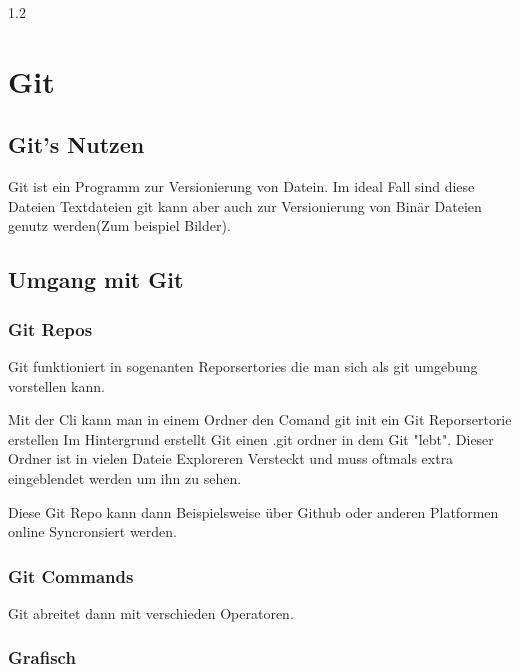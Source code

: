\documentclass{article}
\newcommand{\Zeilenabstand}{1.2}
\newcommand{\absatz}{5mm}
\begin{document}
\begin{spacing}{\Zeilenabstand}
\section{Git}

\subsection{Git's Nutzen}

Git ist ein Programm zur Versionierung von Datein. Im ideal Fall sind diese Dateien
Textdateien git kann aber auch zur Versionierung von Binär Dateien genutz werden(Zum beispiel Bilder).

\subsection{Umgang mit Git}

\subsubsection{Git Repos}

Git funktioniert in sogenanten Reporsertories die man sich als git umgebung vorstellen kann.

\vspace{\absatz}

Mit der Cli kann man in einem Ordner den Comand {\color{red} git init} ein Git Reporsertorie erstellen
Im Hintergrund erstellt Git einen .git ordner in dem Git "lebt". Dieser Ordner ist in vielen 
Dateie Exploreren Versteckt und muss oftmals extra eingeblendet werden um ihn zu sehen.

\vspace{\absatz}

Diese Git Repo kann dann Beispielsweise über Github oder anderen Platformen online 
Syncronsiert werden. 


\subsubsection{Git Commands}

Git abreitet dann mit verschieden Operatoren.

\vspace{\absatz}












\subsubsection{Grafisch}






\end{spacing}
\end{document}
